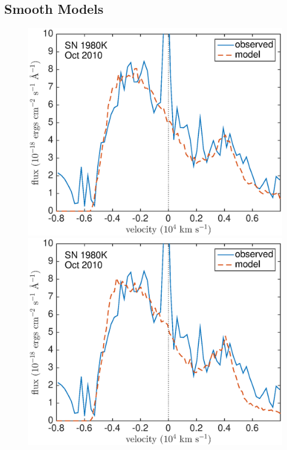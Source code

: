 \subsection{Smooth Models}
\begin{figure}
\centering
\includegraphics[scale=0.4,clip=true, trim=20 0 40 20]{chapters/chapter6/figs/80K/smooth/Ha}
\includegraphics[scale=0.4,clip=true, trim=20 0 40 20]{chapters/chapter6/figs/80K/smooth/Ha_amC}


\end{figure}
